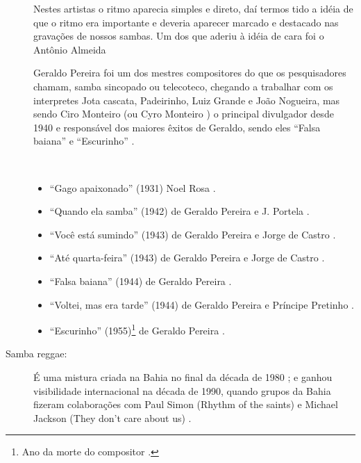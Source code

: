 \begin{description}
Nestes artistas o ritmo aparecia simples e direto, daí termos tido a idéia de 
que o ritmo era importante e deveria aparecer marcado e destacado nas gravações 
de nossos sambas. Um dos que aderiu à idéia de cara foi o Antônio Almeida


Geraldo Pereira foi um dos mestres compositores do que os pesquisadores chamam, samba sincopado ou telecoteco,
chegando a trabalhar com os interpretes Jota cascata, Padeirinho, Luiz Grande e João Nogueira,
mas sendo Ciro Monteiro (ou Cyro Monteiro \cite{avelino2018tecituras}) o principal divulgador desde 1940 e
responsável dos maiores êxitos de Geraldo, sendo eles ``Falsa baiana'' e ``Escurinho'' \cite[pp. 68]{diniz2006almanaque}.

\begin{example} ~

\begin{itemize}
\item ``Gago apaixonado'' (1931) Noel Rosa \cite[pp, 990]{marcondes1977enciclopediav2} \cite[pp. 129]{perna2002samba}.
\item ``Quando ela samba'' (1942) de Geraldo Pereira e J. Portela \cite[pp, 1083]{marcondes1977enciclopediav2} \cite[pp. 52]{diniz2006almanaque}.
\item ``Você está sumindo'' (1943) de Geraldo Pereira e Jorge de Castro \cite[pp, 1154]{marcondes1977enciclopediav2} \cite[pp. 52]{diniz2006almanaque}.
\item ``Até quarta-feira'' (1943) de Geraldo Pereira e Jorge de Castro \cite[pp, 909]{marcondes1977enciclopediav2} \cite[pp. 52]{diniz2006almanaque}.
\item ``Falsa baiana'' (1944) de Geraldo Pereira \cite[pp. 107]{de2003tem} \cite[pp. ]{beattie2003human} \cite[pp. 52]{diniz2006almanaque}.
\item ``Voltei, mas era tarde'' (1944) de Geraldo Pereira e Príncipe Pretinho \cite[pp, 1156]{marcondes1977enciclopediav2} \cite[pp. 52]{diniz2006almanaque}.
\item ``Escurinho'' (1955)\footnote{Ano da morte do compositor \cite[pp. 69]{diniz2006almanaque}.} de Geraldo Pereira \cite[pp. 69]{diniz2006almanaque}.

\end{itemize}
\end{example}


\item[Samba reggae:] 
É uma mistura criada na Bahia no final da década de 1980 \cite[pp. 178]{diniz2008almanaque} \cite[pp. 187]{casa1992anales} \cite[pp. 64]{crook2005brazilian};
e ganhou visibilidade internacional na década de 1990, 
quando grupos da Bahia fizeram  colaborações com Paul Simon (Rhythm of the saints) e  
Michael Jackson (They don't care about us) 
 \cite[pp. 207]{dunn2014brutality} \cite[pp. 64]{crook2005brazilian}.


\end{description}
